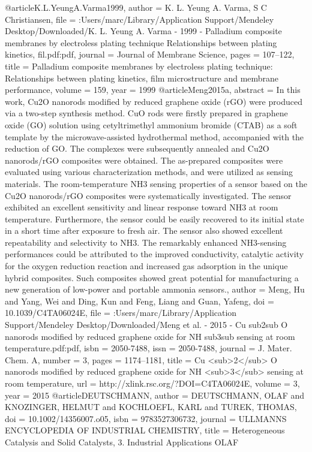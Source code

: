 @article{K.L.YeungA.Varma1999,
author = {{K. L. Yeung A. Varma}, S C Christiansen},
file = {:Users/marc/Library/Application Support/Mendeley Desktop/Downloaded/K. L. Yeung A. Varma - 1999 - Palladium composite membranes by electroless plating technique Relationships between plating kinetics, fil.pdf:pdf},
journal = {Journal of Membrane Science},
pages = {107--122},
title = {{Palladium composite membranes by electroless plating technique: Relationships between plating kinetics, film microstructure and membrane performance}},
volume = {159},
year = {1999}
}
@article{Meng2015a,
abstract = {In this work, Cu2O nanorods modified by reduced graphene oxide (rGO) were produced via a two-step synthesis method. CuO rods were firstly prepared in graphene oxide (GO) solution using cetyltrimethyl ammonium bromide (CTAB) as a soft template by the microwave-assisted hydrothermal method, accompanied with the reduction of GO. The complexes were subsequently annealed and Cu2O nanorods/rGO composites were obtained. The as-prepared composites were evaluated using various characterization methods, and were utilized as sensing materials. The room-temperature NH3 sensing properties of a sensor based on the Cu2O nanorods/rGO composites were systematically investigated. The sensor exhibited an excellent sensitivity and linear response toward NH3 at room temperature. Furthermore, the sensor could be easily recovered to its initial state in a short time after exposure to fresh air. The sensor also showed excellent repeatability and selectivity to NH3. The remarkably enhanced NH3-sensing performances could be attributed to the improved conductivity, catalytic activity for the oxygen reduction reaction and increased gas adsorption in the unique hybrid composites. Such composites showed great potential for manufacturing a new generation of low-power and portable ammonia sensors.},
author = {Meng, Hu and Yang, Wei and Ding, Kun and Feng, Liang and Guan, Yafeng},
doi = {10.1039/C4TA06024E},
file = {:Users/marc/Library/Application Support/Mendeley Desktop/Downloaded/Meng et al. - 2015 - Cu sub2sub O nanorods modified by reduced graphene oxide for NH sub3sub sensing at room temperature.pdf:pdf},
isbn = {2050-7488},
issn = {2050-7488},
journal = {J. Mater. Chem. A},
number = {3},
pages = {1174--1181},
title = {{Cu {\textless}sub{\textgreater}2{\textless}/sub{\textgreater} O nanorods modified by reduced graphene oxide for NH {\textless}sub{\textgreater}3{\textless}/sub{\textgreater} sensing at room temperature}},
url = {http://xlink.rsc.org/?DOI=C4TA06024E},
volume = {3},
year = {2015}
}
@article{DEUTSCHMANN,
author = {DEUTSCHMANN, OLAF and KNOZINGER, HELMUT and KOCHLOEFL, KARL and TUREK, THOMAS},
doi = {10.1002/14356007.o05},
isbn = {9783527306732},
journal = {ULLMANNS ENCYCLOPEDIA OF INDUSTRIAL CHEMISTRY},
title = {{Heterogeneous Catalysis and Solid Catalysts, 3. Industrial Applications OLAF}}
}
